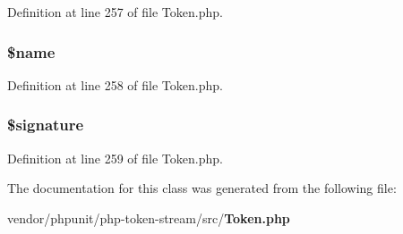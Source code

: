 Definition at line 257 of file Token.\+php.

\subsubsection[{\$name}]{\setlength{\rightskip}{0pt plus 5cm}\${\bf name}\hspace{0.3cm}{\ttfamily [protected]}}\label{class_p_h_p___token___f_u_n_c_t_i_o_n_ab2fc40d43824ea3e1ce5d86dee0d763b}


Definition at line 258 of file Token.\+php.

\subsubsection[{\$signature}]{\setlength{\rightskip}{0pt plus 5cm}\$signature\hspace{0.3cm}{\ttfamily [protected]}}\label{class_p_h_p___token___f_u_n_c_t_i_o_n_a8f34ca1e46a621ab10a3a40addb794f5}


Definition at line 259 of file Token.\+php.



The documentation for this class was generated from the following file\+:\begin{DoxyCompactItemize}
\item 
vendor/phpunit/php-\/token-\/stream/src/{\bf Token.\+php}\end{DoxyCompactItemize}
